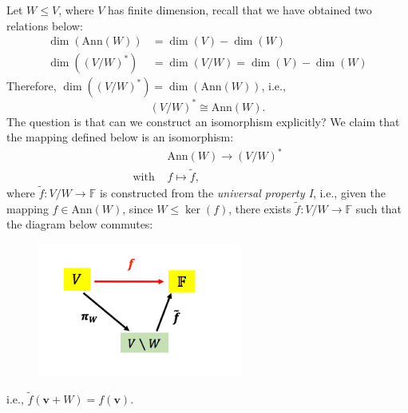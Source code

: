 \begin{remark}
Let $W\le V$, where $V$ has finite dimension, recall that we have obtained two relations below:
\begin{align*}
\dim(\text{Ann}(W)) &= \dim(V) - \dim (W)\\
\dim((V/W)^*)&=\dim(V/W)=\dim(V) - \dim(W)
\end{align*}
Therefore, $\dim((V/W)^*)=\dim(\text{Ann}(W))$, i.e., 
\[
(V/W)^*\cong\text{Ann}(W).
\]
The question is that can we construct an isomorphism explicitly?
We claim that the mapping defined below is an isomorphism:
\[
\begin{array}{ll}
&\text{Ann}(W)\to(V/W)^*\\
\text{with }&f\mapsto \tilde{f},
\end{array}
\]
where $\tilde f:V/W\to\mathbb{F}$ is constructed from the \emph{universal property I}, i.e., given the mapping $f\in\text{Ann}(W)$, since $W\le\ker(f)$, there exists $\tilde f:V/W\to\mathbb{F}$ such that the diagram below commutes:
\begin{figure}[H]
\centering
\includegraphics[width=0.6\textwidth]{week5/p_1}
\end{figure}
i.e., $\tilde{f}(\bm v+W)=f(\bm v)$.
\end{remark}























